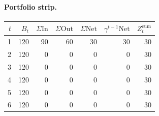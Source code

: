 \documentclass[12pt, a4paper]{article}
\begin{document}
\paragraph{Portfolio strip.}
\begin{center}
\begin{tabular}{rrrrrrr}
\toprule
$t$ & $B_t$ & $\Sigma\mathrm{In}$ & $\Sigma\mathrm{Out}$ & $\Sigma\mathrm{Net}$ & $\gamma^{t-1}\mathrm{Net}$ & $Z_t^{\mathrm{cum}}$\\
\midrule
1 & 120 & 90 & 60 & 30 & 30 & 30 \\
2 & 120 & 0 & 0 & 0 & 0 & 30 \\
3 & 120 & 0 & 0 & 0 & 0 & 30 \\
4 & 120 & 0 & 0 & 0 & 0 & 30 \\
5 & 120 & 0 & 0 & 0 & 0 & 30 \\
6 & 120 & 0 & 0 & 0 & 0 & 30 \\
\bottomrule
\end{tabular}
\end{center}
\end{document}
